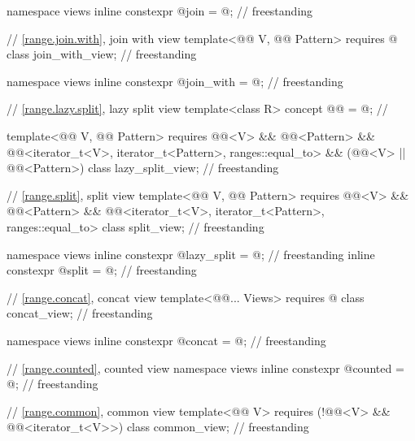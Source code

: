 \begin{codeblock}
{  namespace views { inline constexpr @\unspecnc@ join = @\unspecnc@; }              // freestanding

  // \ref{range.join.with}, join with view
  template<@@ V, @@ Pattern>
    requires @\seebelow@
  class join_with_view;                                                             // freestanding

  namespace views { inline constexpr @\unspecnc@ join_with = @\unspecnc@; }         // freestanding

  // \ref{range.lazy.split}, lazy split view
  template<class R>
    concept @@ = @\seebelow@;   // \expos

  template<@@ V, @@ Pattern>
    requires @@<V> && @@<Pattern> &&
             @@<iterator_t<V>, iterator_t<Pattern>, ranges::equal_to> &&
             (@@<V> || @@<Pattern>)
  class lazy_split_view;                                                            // freestanding

  // \ref{range.split}, split view
 template<@@ V, @@ Pattern>
   requires @@<V> && @@<Pattern> &&
            @@<iterator_t<V>, iterator_t<Pattern>, ranges::equal_to>
  class split_view;                                                                 // freestanding

  namespace views {
    inline constexpr @\unspecnc@ lazy_split = @\unspecnc@;                          // freestanding
    inline constexpr @\unspecnc@ split = @\unspecnc@;                               // freestanding
  }

  // \ref{range.concat}, concat view
  template<@@... Views>
    requires @\seebelow@
  class concat_view;                                                                // freestanding

  namespace views { inline constexpr @\unspecnc@ concat = @\unspecnc@; }            // freestanding

  // \ref{range.counted}, counted view
  namespace views { inline constexpr @\unspecnc@ counted = @\unspecnc@; }           // freestanding

  // \ref{range.common}, common view
  template<@@ V>
    requires (!@@<V> && @@<iterator_t<V>>)
  class common_view;                                                                // freestanding

}
\end{codeblock}
